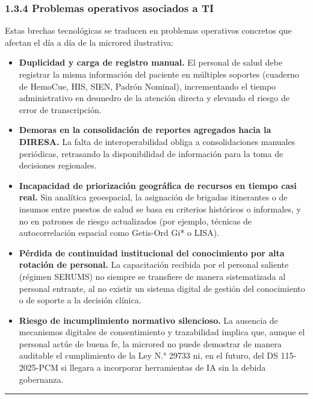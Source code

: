 \documentclass[11pt,a4paper]{article}
\providecommand{\tightlist}{%
  \setlength{\itemsep}{0pt}\setlength{\parskip}{0pt}}
\begin{document}
\subsubsection{1.3.4 Problemas operativos asociados a TI}\label{problemas-operativos-asociados-a-ti}

Estas brechas tecnológicas se traducen en problemas operativos concretos que afectan el día a día de la microred ilustrativa:

\begin{itemize}
\tightlist
\item
  \textbf{Duplicidad y carga de registro manual.} El personal de salud debe registrar la misma información del paciente en múltiples soportes (cuaderno de HemoCue, HIS, SIEN, Padrón Nominal), incrementando el tiempo administrativo en desmedro de la atención directa y elevando el riesgo de error de transcripción.
\item
  \textbf{Demoras en la consolidación de reportes agregados hacia la DIRESA.} La falta de interoperabilidad obliga a consolidaciones manuales periódicas, retrasando la disponibilidad de información para la toma de decisiones regionales.
\item
  \textbf{Incapacidad de priorización geográfica de recursos en tiempo casi real.} Sin analítica geoespacial, la asignación de brigadas itinerantes o de insumos entre puestos de salud se basa en criterios históricos o informales, y no en patrones de riesgo actualizados (por ejemplo, técnicas de autocorrelación espacial como Getis-Ord Gi* o LISA).
\item
  \textbf{Pérdida de continuidad institucional del conocimiento por alta rotación de personal.} La capacitación recibida por el personal saliente (régimen SERUMS) no siempre se transfiere de manera sistematizada al personal entrante, al no existir un sistema digital de gestión del conocimiento o de soporte a la decisión clínica.
\item
  \textbf{Riesgo de incumplimiento normativo silencioso.} La ausencia de mecanismos digitales de consentimiento y trazabilidad implica que, aunque el personal actúe de buena fe, la microred no puede demostrar de manera auditable el cumplimiento de la Ley N.° 29733 ni, en el futuro, del DS 115-2025-PCM si llegara a incorporar herramientas de IA sin la debida gobernanza.
\end{itemize}

\begin{center}\rule{0.5\linewidth}{0.5pt}\end{center}
\end{document}
